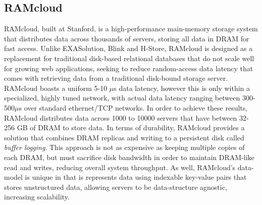 \documentclass[11pt,a4paper]{report}
\begin{document}
\subsection{RAMcloud}
RAMcloud, built at Stanford, is a high-performance main-memory storage system that distributes data across thousands of servers, storing all data in DRAM for fast access.\cite{ramcloudpp, ousterhout2010case} Unlike EXASolution, Blink and H-Store, RAMcloud is designed as a replacement for traditional disk-based relational databases that do not scale well for growing web applications, seeking to reduce random-access data latency that comes with retrieving data from a traditional disk-bound storage server. \cite{ousterhout2010case} RAMcloud boasts a uniform 5-10 $\mu$s data latency, however this is only within a specialized, highly tuned network, with actual data latency ranging between 300-500$\mu$s over standard ethernet/TCP networks. \cite{ousterhout2010case} In order to achieve these results, RAMcloud distributes data across 1000 to 10000 servers that have between 32-256 GB of DRAM to store data. \cite{ramcloudpp} In terms of durability, RAMcloud provides a solution that combines DRAM replicas and writing to a persistent disk called \textit{buffer logging}.\cite{ousterhout2010case} This approach is not as expensive as keeping multiple copies of each DRAM, but must sacrifice disk bandwidth in order to maintain DRAM-like read and writes, reducing overall system throughput. \cite{ousterhout2010case, ramcloudpp} As well, RAMcloud's data-model is unique in that is represents data using indexable key-value pairs that stores unstructured data, allowing servers to be data-structure agnostic, increasing scalability. \cite{ousterhout2010case, ramcloudpp}
\end{document}
